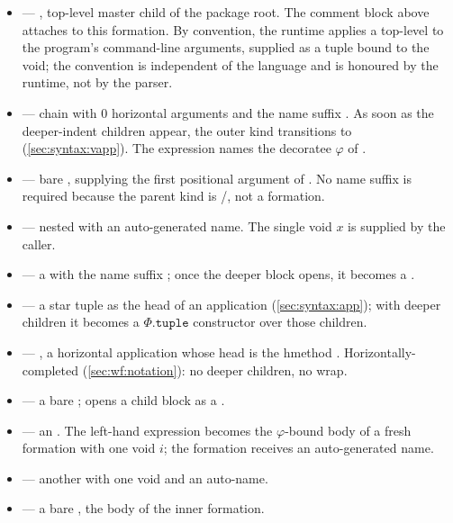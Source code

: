 \begin{itemize}
  \item {} --- ,
    top-level master child of the package root.
    The comment block above attaches to this formation.
    By convention, the runtime applies a top-level  to the
    program's command-line arguments, supplied as a tuple bound to the
     void; the convention is independent of the language and
    is honoured by the runtime, not by the parser.
  \item {} ---  chain with 0 horizontal
    arguments and the name suffix . As soon as the deeper-indent
    children appear, the outer kind transitions to 
    (\cref{sec:syntax:vapp}). The expression names the decoratee
    \(\varphi\) of .
  \item {} --- bare , supplying the first positional
    argument of . No name suffix is required because the
    parent kind is /, not a formation.
  \item \ff{[x] >>} --- nested  with an auto-generated
    name. The single void \(x\) is supplied by the caller.
  \item {} --- a  with the name suffix ;
    once the deeper block opens, it becomes a .
  \item \ff{*} --- a star tuple as the head of an application
    (\cref{sec:syntax:app}); with deeper children it becomes a
    \(\Phi.\mathtt{tuple}\) constructor over those children.
  \item {} --- , a horizontal application
    whose head is the hmethod . Horizontally-completed
    (\cref{sec:wf:notation}): no deeper children, no  wrap.
  \item {} --- a bare ; opens a child block as a
    .
  \item {} --- an .
    The left-hand expression  becomes the \(\varphi\)-bound
    body of a fresh formation with one void \(i\); the formation receives
    an auto-generated name.
  \item \ff{[i] >>} --- another  with one void and an
    auto-name.
  \item {} --- a bare , the body of the inner formation.
\end{itemize}

